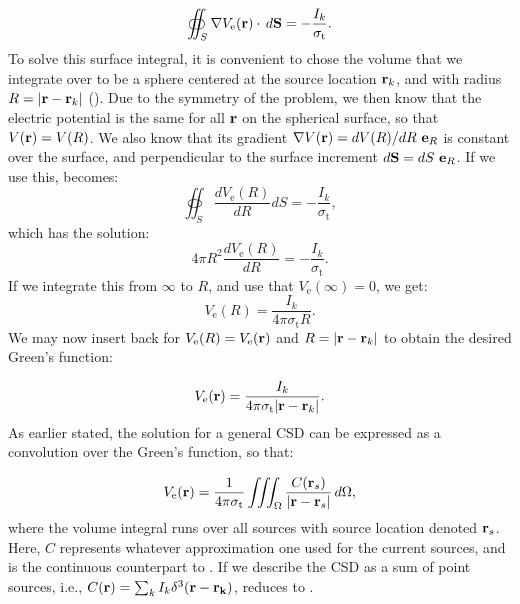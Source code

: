 \begin{equation}
\oiint_{S} \nabla V_\mathrm{e}({\bf r}) \cdot \, d{\bf S}  = - \frac{I_k}{\sigma_\mathrm{t}}.
\label{eq:VC:berit1}
\end{equation}
To solve this surface integral, it is convenient to chose the volume that we integrate over 
to be a sphere centered at the source location ${\bf r}_k$, 
and with radius $R = |{\bf r}-{\bf r}_k|$ (). 
Due to the symmetry of the problem, we then know that the electric potential 
is the same for all ${\bf r}$ on the spherical surface, so that $V({\bf r}) = V(R)$. 
We also know that its gradient $\nabla V({\bf r}) = d V(R)/dR ~{\bf e}_R$ is constant over the surface, 
and perpendicular to the surface increment $d{\bf S} = dS {~\bf e}_R$. 
If we use this,  becomes:
\begin{equation}
\oiint_{S} \frac{d V_\mathrm{e}(R)}{dR} d{S}  = - \frac{I_k}{\sigma_\mathrm{t}},
\label{eq:VC:berit1ogenhalv}
\end{equation}
which has the solution:
\begin{equation}
4\pi R^2 \frac{d V_\mathrm{e}(R)}{dR} = -\frac{I_k}{\sigma_\mathrm{t}}.
\label{eq:VC:berit2}
\end{equation}
If we integrate this from $\infty$ to $R$, and use that $V_\mathrm{e}(\infty) = 0$, we get:
\begin{equation}
V_\mathrm{e}(R) =  \frac{I_k}{4\pi \sigma_\mathrm{t} R}.
\label{eq:VC:berit3}
\end{equation}
We may now insert back for $V_\mathrm{e}(R)= V_\mathrm{e}({\bf r})$ and $R = |{\bf r}-{\bf r}_k|$ to obtain the desired Green's function:

\begin{equation}
V_\mathrm{e}({\bf r})= \frac{I_k}{4\pi \sigma_\mathrm{t} |{\bf r}-{\bf r}_k|}.
\label{eq:VC:berit4}
\end{equation}
As earlier stated, the solution for a general CSD can be expressed as a convolution over the Green's function, so that:

\begin{equation}
V_\mathrm{e}({\bf r}) = \frac{1}{4\pi \sigma_\mathrm{t}}\iiint_{\Omega} \frac{C({\bf r}_s)}{|{\bf r}-{\bf r}_s|} \,d\Omega,
\label{eq:VC:csds}
\end{equation}
where the volume integral runs over all sources with source location denoted ${\bf r}_s$. 
Here, $C$ represents whatever approximation one used for the current sources, 
and  is the continuous counterpart to . 
If we describe the CSD as a sum of point sources, i.e.,  
$C({\bf r}) = \sum_k I_k \delta^3({\bf r} - {\bf r_k})$,  
 reduces to .


